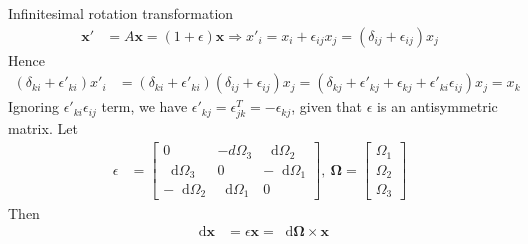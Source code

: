 \documentclass[twoside,9pt]{article}
\numberwithin{equation}{section} %
\renewcommand*\d{\mathop{}\!\mathrm{d}}
\theoremstyle{definition}
\theoremstyle{remark}
\begin{document}
Infinitesimal rotation transformation
\begin{align}
    \mathbf{x}' &= A\mathbf{x}
    = (1 + \epsilon) \mathbf{x}
    \Rightarrow
    x'_i = x_i + \epsilon_{ij}x_j
    = (\delta_{ij} + \epsilon_{ij})x_j
\end{align}
Hence
\begin{align}
    (\delta_{ki} + \epsilon'_{ki})x'_i &= 
    (\delta_{ki} + \epsilon'_{ki})
    (\delta_{ij} + \epsilon_{ij}) x_j
    = (\delta_{kj} + \epsilon'_{kj} + \epsilon_{kj} 
    + \epsilon'_{ki}\epsilon_{ij})x_j
    = x_k
\end{align}
Ignoring $\epsilon'_{ki}\epsilon_{ij}$ term,
we have $\epsilon'_{kj} = \epsilon^T_{jk} = -\epsilon_{kj}$,
given that $\epsilon$ is an antisymmetric matrix.
Let
\begin{align}
    \epsilon &= \begin{bmatrix}
        0 & -d\Omega_3 & \d\Omega_2\\
        \d\Omega_3 & 0 & -\d\Omega_1\\
        -\d\Omega_2 & \d\Omega_1 & 0
    \end{bmatrix},~
    \boldsymbol{\Omega} = \begin{bmatrix}
        \Omega_1\\ \Omega_2 \\ \Omega_3
    \end{bmatrix}
\end{align}
Then
\begin{align}
    \d\mathbf{x} &= \epsilon\mathbf{x} = \d\boldsymbol{\Omega}\times\mathbf{x}
\end{align}
\end{document}
